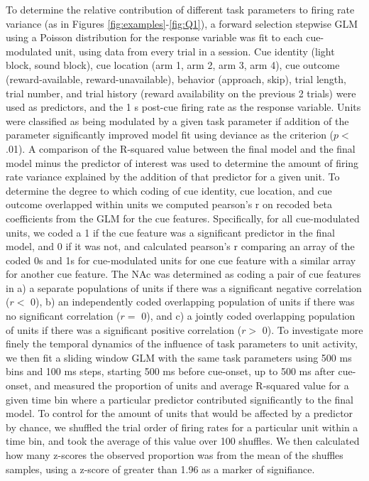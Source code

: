 \documentclass[11pt]{article}
\begin{document}
To determine the relative contribution of different task parameters to firing rate variance (as in Figures \ref{fig:examples}-\ref{fig:Q1}), a forward selection stepwise GLM using a Poisson distribution for the response variable was fit to each cue-modulated unit, using data from every trial in a session. Cue identity (light block, sound block), cue location (arm 1, arm 2, arm 3, arm 4), cue outcome (reward-available, reward-unavailable), behavior (approach, skip), trial length, trial number, and trial history (reward availability on the previous 2 trials) were used as predictors, and the 1 s post-cue firing rate as the response variable. Units were classified as being modulated by a
given task parameter if addition of the parameter significantly
improved model fit using deviance as the criterion ($p <$ .01). A
comparison of the R-squared value between the final model and the
final model minus the predictor of interest was used to determine the
amount of firing rate variance explained by the addition of that
predictor for a given unit. To determine the degree to which coding of
cue identity, cue location, and cue outcome overlapped within units we
computed pearson’s r on recoded beta coefficients from the GLM for the
cue features. Specifically, for all cue-modulated units, we coded a 1
if the cue feature was a significant predictor in the final model, and
0 if it was not, and calculated pearson’s r comparing an array of the
coded 0s and 1s for cue-modulated units for one cue feature with a
similar array for another cue feature. The NAc was determined as
coding a pair of cue features in a) a separate populations of units if
there was a significant negative correlation ($r < $ 0), b) an
independently coded overlapping population of units if there was no
significant correlation ($r = $ 0), and c) a jointly coded overlapping
population of units if there was a significant positive correlation
($r > $ 0). To investigate more finely the temporal dynamics of the influence of task parameters to unit activity, we then fit a sliding window GLM with the same task parameters using 500 ms bins and 100 ms steps, starting 500 ms before cue-onset, up to 500 ms after cue-onset, and measured the proportion of units and average R-squared value for a given time bin where a particular predictor contributed significantly to the final model. To control for the amount of units that would be affected by a predictor by chance, we shuffled the trial order of firing rates for a particular unit within a time bin, and took the average of this value over 100 shuffles. We then calculated how many z-scores the observed proportion was from the mean of the shuffles samples, using a z-score of greater than 1.96 as a marker of signifiance.
\end{document}
